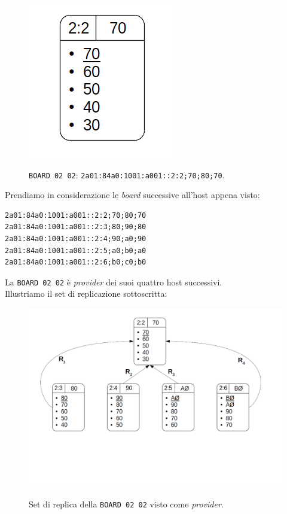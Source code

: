 \begin{figure}[htbp]
\centering
\includegraphics[scale=0.70]{img/focus_provider.png}\\
\caption{\verb"BOARD 02 02": \verb"2a01:84a0:1001:a001::2:2;70;80;70". \label{figura1.16}}
\end{figure}

Prendiamo in considerazione le \textit{board} successive all'host appena visto:

\begin{verbatim}
2a01:84a0:1001:a001::2:2;70;80;70
2a01:84a0:1001:a001::2:3;80;90;80
2a01:84a0:1001:a001::2:4;90;a0;90
2a01:84a0:1001:a001::2:5;a0;b0;a0
2a01:84a0:1001:a001::2:6;b0;c0;b0
\end{verbatim}

La \verb"BOARD 02 02" \`{e} \textit{provider} dei suoi quattro host successivi. \\
Illustriamo il set di replicazione sottoscritta:

\begin{figure}[htbp]
\centering
\includegraphics[scale=0.40]{img/prov_replica.png}\\
\caption{Set di replica della \verb"BOARD 02 02" visto come \textit{provider}. \label{figura1.17}}
\end{figure}


